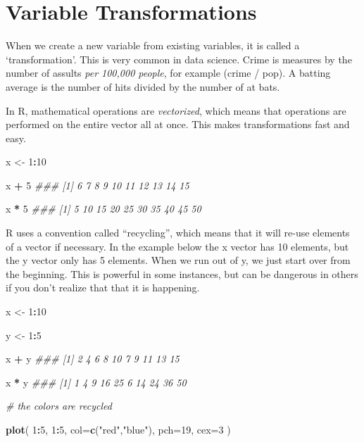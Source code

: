 \documentclass[]{book}
\newenvironment{Shaded}{\begin{snugshade}}{\end{snugshade}}
\newcommand{\CommentTok}[1]{\textcolor[rgb]{0.56,0.35,0.01}{\textit{#1}}}
\newcommand{\DataTypeTok}[1]{\textcolor[rgb]{0.13,0.29,0.53}{#1}}
\newcommand{\DecValTok}[1]{\textcolor[rgb]{0.00,0.00,0.81}{#1}}
\newcommand{\KeywordTok}[1]{\textcolor[rgb]{0.13,0.29,0.53}{\textbf{#1}}}
\newcommand{\NormalTok}[1]{#1}
\newcommand{\OperatorTok}[1]{\textcolor[rgb]{0.81,0.36,0.00}{\textbf{#1}}}
\newcommand{\StringTok}[1]{\textcolor[rgb]{0.31,0.60,0.02}{#1}}
\theoremstyle{definition}
\theoremstyle{definition}
\theoremstyle{definition}
\theoremstyle{remark}
\begin{document}
\hypertarget{variable-transformations}{%
\section{Variable Transformations}\label{variable-transformations}}

When we create a new variable from existing variables, it is called a
`transformation'. This is very common in data science. Crime is measures
by the number of assults \emph{per 100,000 people}, for example (crime /
pop). A batting average is the number of hits divided by the number of
at bats.

In R, mathematical operations are \emph{vectorized}, which means that
operations are performed on the entire vector all at once. This makes
transformations fast and easy.

\begin{Shaded}
\begin{Highlighting}[]

\NormalTok{x <-}\StringTok{ }\DecValTok{1}\OperatorTok{:}\DecValTok{10}

\NormalTok{x }\OperatorTok{+}\StringTok{ }\DecValTok{5}
\CommentTok{###  [1]  6  7  8  9 10 11 12 13 14 15}

\NormalTok{x }\OperatorTok{*}\StringTok{ }\DecValTok{5}
\CommentTok{###  [1]  5 10 15 20 25 30 35 40 45 50}
\end{Highlighting}
\end{Shaded}

R uses a convention called ``recycling'', which means that it will
re-use elements of a vector if necessary. In the example below the x
vector has 10 elements, but the y vector only has 5 elements. When we
run out of y, we just start over from the beginning. This is powerful in
some instances, but can be dangerous in others if you don't realize that
that it is happening.

\begin{Shaded}
\begin{Highlighting}[]

\NormalTok{x <-}\StringTok{ }\DecValTok{1}\OperatorTok{:}\DecValTok{10}

\NormalTok{y <-}\StringTok{ }\DecValTok{1}\OperatorTok{:}\DecValTok{5}

\NormalTok{x }\OperatorTok{+}\StringTok{ }\NormalTok{y}
\CommentTok{###  [1]  2  4  6  8 10  7  9 11 13 15}

\NormalTok{x }\OperatorTok{*}\StringTok{ }\NormalTok{y}
\CommentTok{###  [1]  1  4  9 16 25  6 14 24 36 50}

\CommentTok{# the colors are recycled}

\KeywordTok{plot}\NormalTok{( }\DecValTok{1}\OperatorTok{:}\DecValTok{5}\NormalTok{, }\DecValTok{1}\OperatorTok{:}\DecValTok{5}\NormalTok{, }\DataTypeTok{col=}\KeywordTok{c}\NormalTok{(}\StringTok{"red"}\NormalTok{,}\StringTok{"blue"}\NormalTok{), }\DataTypeTok{pch=}\DecValTok{19}\NormalTok{, }\DataTypeTok{cex=}\DecValTok{3}\NormalTok{ )}
\end{Highlighting}
\end{Shaded}
\end{document}
